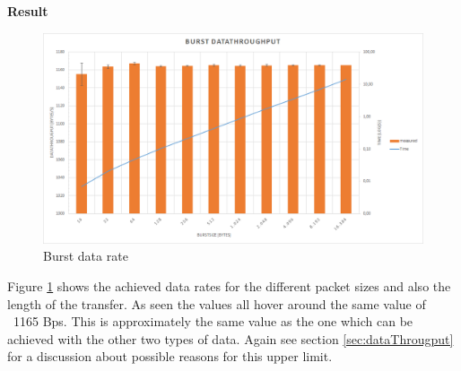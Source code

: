 \begin{description}
	\item{\textbf{Result}} \hfill \\ 
	\begin{figure}[h]
		\centering
		\includegraphics[scale=0.5]{content/images/exp5.png}
		\caption{Burst data rate}\label{fig:exp5}
	\end{figure}
	Figure \ref{fig:exp5} shows the achieved data rates for the different packet sizes and also the length of the transfer. As seen the values all hover around the same value of ~1165 Bps. This is approximately the same value as the one which can be achieved with the other two types of data.
	Again see section \ref{sec:dataThrougput} for a discussion about possible reasons for this upper limit. 
\end{description}
\newpage

